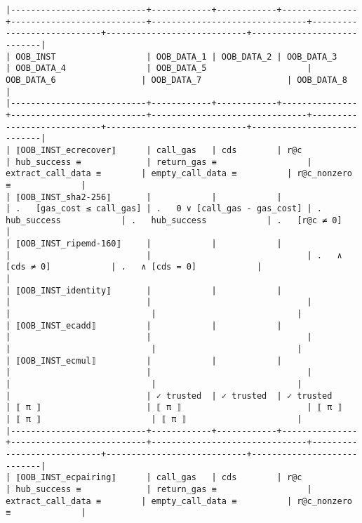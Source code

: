 \documentclass[varwidth=\maxdimen,margin=0.5cm,multi={verbatim}]{standalone}
\begin{document}
\begin{verbatim}
|---------------------------+------------+------------+---------------+---------------------------+-------------------------------+----------------------------+----------------------------+----------------------------|
| OOB_INST                  | OOB_DATA_1 | OOB_DATA_2 | OOB_DATA_3    | OOB_DATA_4                | OOB_DATA_5                    | OOB_DATA_6                 | OOB_DATA_7                 | OOB_DATA_8                 |
|---------------------------+------------+------------+---------------+---------------------------+-------------------------------+----------------------------+----------------------------+----------------------------|
| ⟦OOB_INST_ecrecover⟧      | call_gas   | cds        | r@c           | hub_success ≡             | return_gas ≡                  | extract_call_data ≡        | empty_call_data ≡          | r@c_nonzero ≡              |
| ⟦OOB_INST_sha2-256⟧       |            |            |               | .   [gas_cost ≤ call_gas] | .   0 ∨ [call_gas - gas_cost] | .   hub_success            | .   hub_success            | .   [r@c ≠ 0]              |
| ⟦OOB_INST_ripemd-160⟧     |            |            |               |                           |                               | .   ∧ [cds ≠ 0]            | .   ∧ [cds = 0]            |                            |
| ⟦OOB_INST_identity⟧       |            |            |               |                           |                               |                            |                            |                            |
| ⟦OOB_INST_ecadd⟧          |            |            |               |                           |                               |                            |                            |                            |
| ⟦OOB_INST_ecmul⟧          |            |            |               |                           |                               |                            |                            |                            |
|                           | ✓ trusted  | ✓ trusted  | ✓ trusted     | ⟦ π ⟧                     | ⟦ π ⟧                         | ⟦ π ⟧                      | ⟦ π ⟧                      | ⟦ π ⟧                      |
|---------------------------+------------+------------+---------------+---------------------------+-------------------------------+----------------------------+----------------------------+----------------------------|
| ⟦OOB_INST_ecpairing⟧      | call_gas   | cds        | r@c           | hub_success ≡             | return_gas ≡                  | extract_call_data ≡        | empty_call_data ≡          | r@c_nonzero ≡              |

\end{verbatim}
\end{document}
